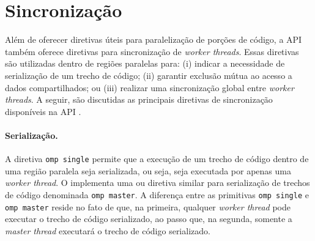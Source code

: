 \documentclass{SBCbookchapter}
\begin{document}
\section{Sincronização}
\label{section: sincronizacao}

	Além de oferecer diretivas úteis para paralelização de porções de código, a API
	\openmp também oferece diretivas para sincronização de \textit{worker threads}. Essas
	diretivas são utilizadas dentro de regiões paralelas para: (i) indicar a necessidade de serialização
	de um trecho de código; (ii) garantir exclusão mútua ao acesso a dados compartilhados; ou
	(iii) realizar uma sincronização global entre \textit{worker threads}. A seguir, são discutidas
	as principais diretivas de sincronização disponíveis na API \openmp.

		\paragraph{Serialização.} A diretiva \texttt{omp single} permite que a execução de um trecho
		de código dentro de uma região paralela seja serializada, ou seja, seja executada por apenas
		uma \textit{worker thread}. O \openmp implementa uma ou diretiva similar para serialização
		de trechos de código denominada \texttt{omp master}. A diferença entre as primitivas \texttt{omp single}
		e \texttt{omp master} reside no fato de que, na primeira, qualquer \textit{worker thread} pode executar
		o trecho de código serializado, ao passo que, na segunda, somente a \textit{master thread} executará
		o trecho de código serializado.
		
\end{document}
